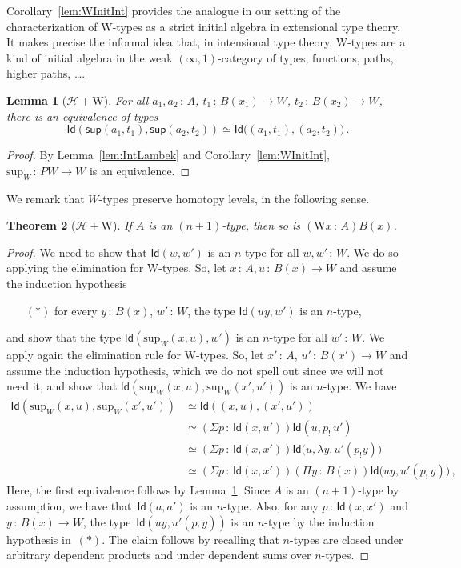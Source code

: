 \documentclass[10pt,a4paper,oneside,reqno]{amsart}
\numberwithin{equation}{section}
\theoremstyle{mythm}
\newtheorem{theorem}{Theorem}[section]
\newtheorem{lemma}[theorem]{Lemma}
\theoremstyle{mydef}
\theoremstyle{myrmk}
\newcommand{\co}{\,{:}\,}
\newcommand{\Hint}{\mathcal{H}}
\newcommand{\Id}{\mathsf{Id}}
\newcommand{\W}{\mathrm{W}}
\newcommand{\wsup}{\mathsf{sup}}
\renewcommand{\sup}{\mathrm{sup}}
\begin{document}
Corollary~\ref{lem:WInitInt} provides the analogue in our setting of the characterization of W-types as a strict initial algebra in extensional type theory. It makes precise the informal idea that, in intensional type theory, W-types are a kind of initial algebra in the weak $(\infty, 1)$-category of types, functions, paths, higher paths, \ldots.  

\begin{lemma}[$\Hint + \W$]\label{lem:suppath}
For all $a_1,a_2 \co A$, $t_1 \co B(x_1) \to W$, $t_2 \co B(x_2) \to W$, there is an equivalence of types
\[ 
\Id ( \wsup(a_1,t_1),  \wsup(a_2,t_2)  ) \simeq  \Id \big( (a_1,t_1), (a_2,t_2) \big) \, . 
\]
\end{lemma}

\begin{proof}
By Lemma~\ref{lem:IntLambek} and Corollary~\ref{lem:WInitInt}, $\sup_W \co PW \to W$ is an equivalence.
\end{proof}





We  remark that $W$-types  preserve homotopy levels, in the following sense.

\begin{theorem}[$\Hint + \W$]
If $A$ is an $(n+1)$-type, then so is $(\W x \co A) B(x)$.
\end{theorem}


\begin{proof}
We need to show that $\Id(w, w')$ is an $n$-type for all $w, w' \co W$. We do so applying the elimination for W-types.
So, let $x \co A, u \co B(x) \to W$ and assume the induction hypothesis 
\begin{itemize}
\item[$(\ast)$] for every $y \co B(x)$, $w' \co W$, the type $\Id( uy ,w')$ is an $n$-type, 
\end{itemize}
and show that  the type $\Id(\sup_W(x,u), w')$ is an $n$-type for all $w' \co W$. We apply again the elimination rule for W-types. So, let   $x' \co A$, $u' \co B(x') \to W$ and assume the induction hypothesis, which we do not spell out since we will not need it, and show that $\Id( \sup_W(x,u) , \sup_W(x',u'))$ is an $n$-type. We have
\begin{align*} 
\Id(\sup_W(x,u), \sup_W(x',u'))
& \simeq \Id((x,u) , (x',u')) \\
& \simeq (\Sigma p \co \Id(x, u')) \Id( u , p_{!} \, u' )   \\
& \simeq (\Sigma p \co \Id(x,x'))  \Id\big(u , \lambda y. \,  u'( p_{!} y)\big) \\
& \simeq (\Sigma p \co \Id(x,x')) (\Pi y \co B(x)) \Id \big( uy  , u'(p_{!} \, y)\big) \, , 
\end{align*}
Here, the first equivalence follows by Lemma~\ref{lem:suppath}. Since $A$ is an $(n+1)$-type by assumption, we have 
that~$\Id(a,a')$ is an $n$-type. Also, for any $p \co \Id(x,x')$ and $y \co B(x) \to W$, the type~$\Id(uy ,  u'(p_{!} \, y))$ is an $n$-type by the 
induction 
hypothesis in~$(\ast)$. The claim follows by recalling that $n$-types are closed under arbitrary dependent products and under dependent 
sums over $n$-types. 
\end{proof}
\end{document}
